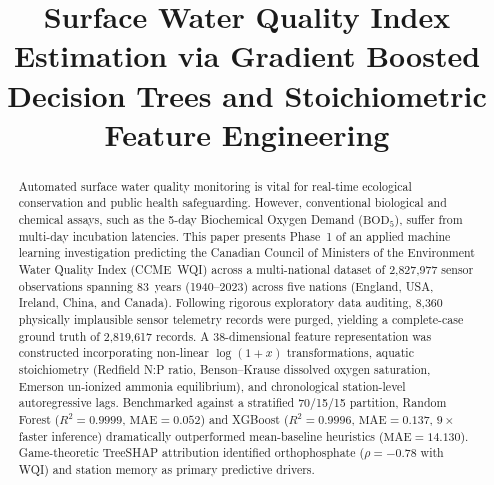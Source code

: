 \documentclass[conference]{IEEEtran}
\begin{document}

\title{Surface Water Quality Index Estimation via Gradient Boosted
       Decision Trees and Stoichiometric Feature Engineering}

\author{
}

\maketitle

\begin{abstract}
Automated surface water quality monitoring is vital for real-time
ecological conservation and public health safeguarding. However,
conventional biological and chemical assays, such as the 5-day
Biochemical Oxygen Demand ($\text{BOD}_5$), suffer from multi-day
incubation latencies. This paper presents Phase~1 of an applied
machine learning investigation predicting the Canadian Council of
Ministers of the Environment Water Quality Index (CCME~WQI) across a
multi-national dataset of 2,827,977 sensor observations spanning
83~years (1940--2023) across five nations (England, USA, Ireland,
China, and Canada). Following rigorous exploratory data auditing,
8,360 physically implausible sensor telemetry records were purged,
yielding a complete-case ground truth of 2,819,617 records. A
38-dimensional feature representation was constructed incorporating
non-linear $\log(1+x)$ transformations, aquatic stoichiometry (Redfield
N:P ratio, Benson--Krause dissolved oxygen saturation, Emerson
un-ionized ammonia equilibrium), and chronological station-level
autoregressive lags. Benchmarked against a stratified 70/15/15
partition, Random Forest ($R^2{=}0.9999$, $\text{MAE}{=}0.052$) and
XGBoost ($R^2{=}0.9996$, $\text{MAE}{=}0.137$, $9{\times}$ faster
inference) dramatically outperformed mean-baseline heuristics
($\text{MAE}{=}14.130$). Game-theoretic TreeSHAP attribution identified
orthophosphate ($\rho{=}{-0.78}$ with WQI) and station memory as
primary predictive drivers.
\end{abstract}
\end{document}
